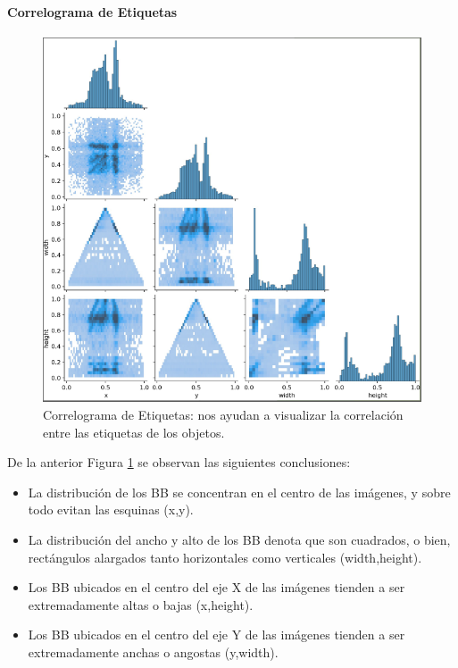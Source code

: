 \paragraph{Correlograma de Etiquetas}
\begin{figure}[h!]
    \centering
    \includegraphics[width=1\textwidth]{img/correlograma de etiquetas.png}
    \caption{Correlograma de Etiquetas: nos ayudan a visualizar la correlación entre las etiquetas de los objetos. }
    \label{fig:correlograma de etiquetas}
\end{figure}

De la anterior Figura \ref{fig:correlograma de etiquetas} se observan las siguientes conclusiones:
\begin{itemize}
    \item La distribución de los BB se concentran en el centro de las imágenes, y sobre todo evitan las esquinas (x,y). 
    \item La distribución del ancho y alto de los BB denota que son cuadrados, o bien, rectángulos alargados tanto horizontales como verticales (width,height).
    \item Los BB ubicados en el centro del eje X de las imágenes tienden a ser extremadamente altas o bajas (x,height).
    \item Los BB ubicados en el centro del eje Y de las imágenes tienden a ser extremadamente anchas o angostas (y,width).
\end{itemize}
